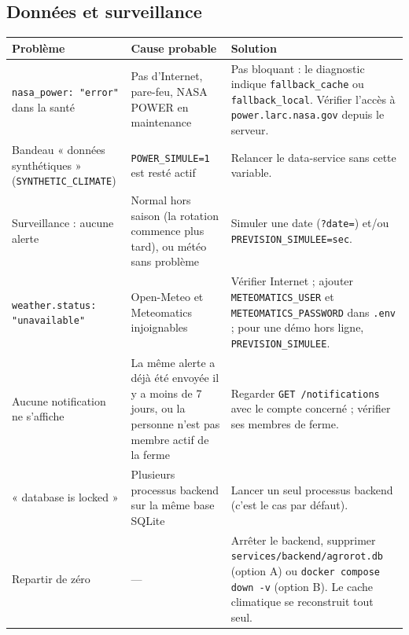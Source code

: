\documentclass[11pt,a4paper]{article}
\begin{document}
\subsection{Données et surveillance}
\begin{center}
\small
\begin{longtable}{L{4.6cm}L{4cm}L{6.4cm}}
\toprule
\textbf{Problème} & \textbf{Cause probable} & \textbf{Solution} \\
\midrule
\endhead
\texttt{nasa\_power: "error"} dans la santé & Pas d'Internet, pare-feu, NASA POWER en maintenance & Pas bloquant : le diagnostic indique \texttt{fallback\_cache} ou \texttt{fallback\_local}. Vérifier l'accès à \texttt{power.larc.nasa.gov} depuis le serveur. \\
Bandeau « données synthétiques » (\texttt{SYNTHETIC\_CLIMATE}) & \texttt{POWER\_SIMULE=1} est resté actif & Relancer le data-service sans cette variable. \\
Surveillance : aucune alerte & Normal hors saison (la rotation commence plus tard), ou météo sans problème & Simuler une date (\texttt{?date=}) et/ou \texttt{PREVISION\_SIMULEE=sec}. \\
\texttt{weather.status: "unavailable"} & Open-Meteo et Meteomatics injoignables & Vérifier Internet ; ajouter \texttt{METEOMATICS\_USER} et \texttt{METEOMATICS\_PASSWORD} dans \texttt{.env} ; pour une démo hors ligne, \texttt{PREVISION\_SIMULEE}. \\
Aucune notification ne s'affiche & La même alerte a déjà été envoyée il y a moins de 7 jours, ou la personne n'est pas membre actif de la ferme & Regarder \texttt{GET /notifications} avec le compte concerné ; vérifier ses membres de ferme. \\
« database is locked » & Plusieurs processus backend sur la même base SQLite & Lancer un seul processus backend (c'est le cas par défaut). \\
Repartir de zéro & — & Arrêter le backend, supprimer \texttt{services/backend/agrorot.db} (option A) ou \texttt{docker compose down -v} (option B). Le cache climatique se reconstruit tout seul. \\
\bottomrule
\end{longtable}
\end{center}
\end{document}
